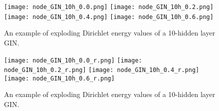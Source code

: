\documentclass[11pt]{article}
\begin{document}
\begin{figure}[h]
    \centering
    \texttt{[image: node\_GIN\_10h\_0.0.png]}
    \texttt{[image: node\_GIN\_10h\_0.2.png]}
    \texttt{[image: node\_GIN\_10h\_0.4.png]}
    \texttt{[image: node\_GIN\_10h\_0.6.png]}
    \caption{An example of exploding Dirichlet energy values of a 10-hidden layer GIN.}
    \label{fig:energy}
\end{figure}

\begin{figure}[h]
    \centering
    \texttt{[image: node\_GIN\_10h\_0.0\_r.png]}
    \texttt{[image: node\_GIN\_10h\_0.2\_r.png]}
    \texttt{[image: node\_GIN\_10h\_0.4\_r.png]}
    \texttt{[image: node\_GIN\_10h\_0.6\_r.png]}
    \caption{An example of exploding Dirichlet energy values of a 10-hidden layer GIN.}
    \label{fig:rayleigh}
\end{figure}
\end{document}

